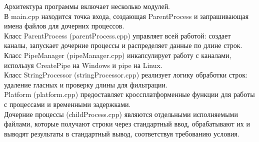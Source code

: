 Архитектура программы включает несколько модулей. \\
В main.cpp находится точка входа, создающая ParentProcess и запрашивающая имена файлов для дочерних процессов. \\
Класс ParentProcess (parentProcess.cpp) управляет всей работой: создает каналы, запускает дочерние процессы и распределяет данные по длине строк. \\
Класс PipeManager (pipeManager.cpp) инкапсулирует работу с каналами, используя CreatePipe на Windows и pipe на Linux. \\
Класс StringProcessor (stringProcessor.cpp) реализует логику обработки строк: удаление гласных и проверку длины для фильтрации. \\
Platform (platform.cpp) предоставляет кроссплатформенные функции для работы с процессами и временными задержками.\\

Дочерние процессы (childProcess.cpp) являются отдельными исполняемыми файлами, которые получают строки через стандартный ввод, обрабатывают их и выводят результаты в стандартный вывод, соответствуя требованию условия.